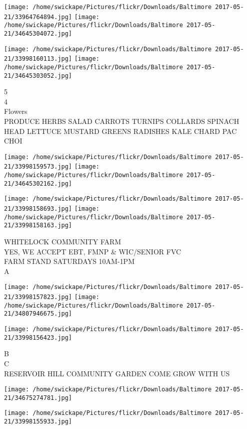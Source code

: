 \documentclass[10pt,letterpaper]{article}
\begin{document}
\texttt{[image: /home/swickape/Pictures/flickr/Downloads/Baltimore 2017-05-21/33964764894.jpg]}
\texttt{[image: /home/swickape/Pictures/flickr/Downloads/Baltimore 2017-05-21/34645304072.jpg]}

\texttt{[image: /home/swickape/Pictures/flickr/Downloads/Baltimore 2017-05-21/33998160113.jpg]}
\texttt{[image: /home/swickape/Pictures/flickr/Downloads/Baltimore 2017-05-21/34645303052.jpg]}

5\\
4\\
Flowers\\
PRODUCE HERBS SALAD CARROTS TURNIPS COLLARDS SPINACH HEAD LETTUCE MUSTARD GREENS RADISHES KALE CHARD PAC CHOI
\pagebreak

\texttt{[image: /home/swickape/Pictures/flickr/Downloads/Baltimore 2017-05-21/33998159573.jpg]}
\texttt{[image: /home/swickape/Pictures/flickr/Downloads/Baltimore 2017-05-21/34645302162.jpg]}

\texttt{[image: /home/swickape/Pictures/flickr/Downloads/Baltimore 2017-05-21/33998158693.jpg]}
\texttt{[image: /home/swickape/Pictures/flickr/Downloads/Baltimore 2017-05-21/33998158163.jpg]}

WHITELOCK COMMUNITY FARM\\
YES, WE ACCEPT EBT, FMNP \& WIC/SENIOR FVC\\
FARM STAND SATURDAYS 10AM{-}1PM\\
A
\pagebreak

\texttt{[image: /home/swickape/Pictures/flickr/Downloads/Baltimore 2017-05-21/33998157823.jpg]}
\texttt{[image: /home/swickape/Pictures/flickr/Downloads/Baltimore 2017-05-21/34807946675.jpg]}

\texttt{[image: /home/swickape/Pictures/flickr/Downloads/Baltimore 2017-05-21/33998156423.jpg]}

B\\
C\\
RESERVOIR HILL COMMUNITY GARDEN COME GROW WITH US
\pagebreak

\texttt{[image: /home/swickape/Pictures/flickr/Downloads/Baltimore 2017-05-21/34675274781.jpg]}

\vspace{0.25in}
\texttt{[image: /home/swickape/Pictures/flickr/Downloads/Baltimore 2017-05-21/33998155933.jpg]}
\end{document}
